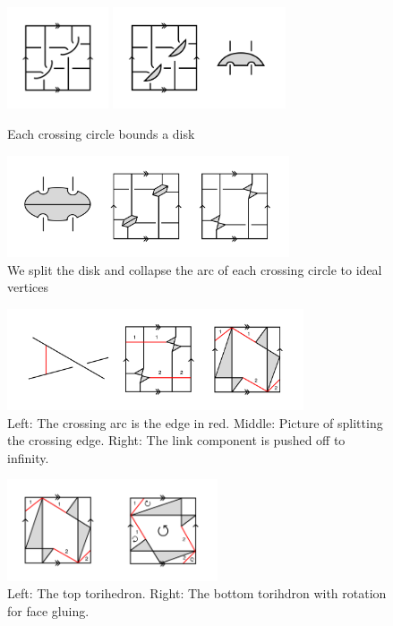 \documentclass[11pt]{amsart}
\theoremstyle{plain}
\theoremstyle{definition}
\begin{document}
\begin{figure}[h] 
\centering
\includegraphics[height=3cm]{fig-3}
\includegraphics[height=3cm]{fig-4}
	\caption{Each crossing circle bounds a disk}
\end{figure}
 
\begin{figure}[h] 
\centering 
\includegraphics[height=3cm]{fig-5} 
	\caption{We split the disk and collapse the arc of each
 crossing circle to ideal vertices} 
\end{figure}


\begin{figure}[h] 
\centering 
\includegraphics[height=3cm]{fig-6} 
\caption{Left: The crossing arc is the edge in red.
Middle: Picture of splitting the crossing edge. Right: The link component is
pushed off to infinity.} 
\end{figure}

\begin{figure}[h] 
\centering 
\includegraphics[height=3cm]{top-bottom} 
	\caption{Left: The top torihedron. Right: The bottom torihdron with rotation for face gluing.} 
\label{fig:top-bottom}
\end{figure}
\end{document}
